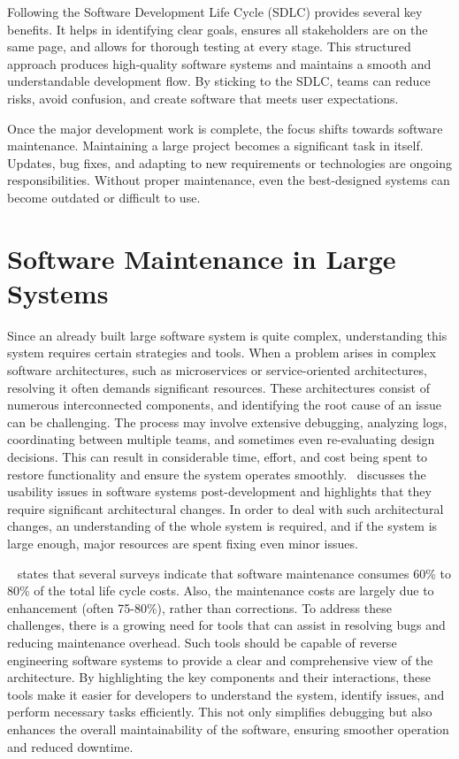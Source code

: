 Following the Software Development Life Cycle (SDLC) provides several key benefits. It helps in identifying clear goals, ensures all stakeholders are on the same page, and allows for thorough testing at every stage. This structured approach produces high-quality software systems and maintains a smooth and understandable development flow. By sticking to the SDLC, teams can reduce risks, avoid confusion, and create software that meets user expectations.

Once the major development work is complete, the focus shifts towards software maintenance. Maintaining a large project becomes a significant task in itself. Updates, bug fixes, and adapting to new requirements or technologies are ongoing responsibilities. Without proper maintenance, even the best-designed systems can become outdated or difficult to use.

\section{Software Maintenance in Large Systems}

Since an already built large software system is quite complex, understanding this system requires certain strategies and tools. When a problem arises in complex software architectures, such as microservices or service-oriented architectures, resolving it often demands significant resources. These architectures consist of numerous interconnected components, and identifying the root cause of an issue can be challenging. The process may involve extensive debugging, analyzing logs, coordinating between multiple teams, and sometimes even re-evaluating design decisions. This can result in considerable time, effort, and cost being spent to restore functionality and ensure the system operates smoothly.~\citep{Folmer2005} discusses the usability issues in software systems post-development and highlights that they require significant architectural changes. In order to deal with such architectural changes, an understanding of the whole system is required, and if the system is large enough, major resources are spent fixing even minor issues.

~\citep{SeMaintainance2001} states that several surveys indicate that software maintenance consumes 60\% to 80\% of the total life cycle costs. Also, the maintenance costs are largely due to enhancement (often 75{-}80\%), rather than corrections. To address these challenges, there is a growing need for tools that can assist in resolving bugs and reducing maintenance overhead. Such tools should be capable of reverse engineering software systems to provide a clear and comprehensive view of the architecture. By highlighting the key components and their interactions, these tools make it easier for developers to understand the system, identify issues, and perform necessary tasks efficiently. This not only simplifies debugging but also enhances the overall maintainability of the software, ensuring smoother operation and reduced downtime.

